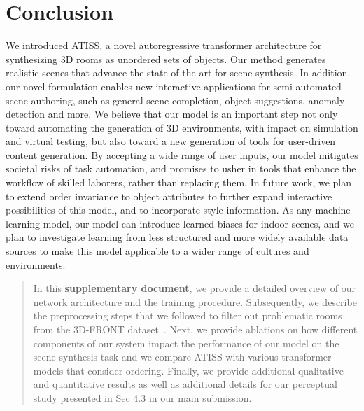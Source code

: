 \documentclass{article}
\begin{document}
\vspace{-2mm}
\section{Conclusion}\label{sec:conclusion}
\vspace{-2mm}



We introduced ATISS,
 a novel autoregressive transformer architecture for
synthesizing 3D rooms as unordered sets of objects. Our method generates realistic scenes that advance the state-of-the-art for scene synthesis. In addition, our novel formulation enables new interactive applications for semi-automated scene authoring, such as general scene completion, object suggestions, anomaly detection and more. We believe that our model is an important step not only toward automating the generation of 3D environments, with impact on simulation and virtual testing, but also toward a new generation of tools for user-driven content generation. By accepting a wide range of user inputs, our model mitigates societal risks of task automation, and promises to usher in tools that enhance the workflow of skilled laborers, rather than replacing them. In future work, we plan to extend order invariance to object attributes to further expand interactive possibilities of this model, and to incorporate style information. As any machine learning model, our model can introduce learned biases for indoor scenes, and we plan to investigate learning from less structured and more widely available data sources to make this model applicable to a wider range of cultures and environments.


{\small
	
	
}

\newpage
\clearpage
\appendix


\begin{abstract}
In this \textbf{supplementary document}, we provide a detailed overview of our
network architecture and the training procedure. Subsequently, we describe
the preprocessing steps that we followed to filter out problematic rooms from
the 3D-FRONT dataset~\cite{Fu2020ARXIVa}. Next, we provide ablations on how
different components of our system impact the performance of our model on the
scene synthesis task and we compare ATISS with various transformer models that
consider ordering. Finally, we provide additional qualitative and quantitative
results as well as additional details for our perceptual study presented in Sec
$4.3$ in our main submission.
\end{abstract}
\end{document}
